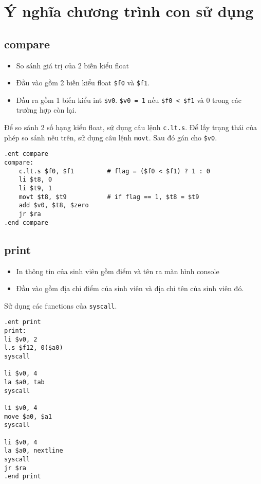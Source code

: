 \documentclass{article}
\begin{document}
\section{Ý nghĩa chương trình con sử dụng}
\subsection{compare}
\begin{itemize}
    \item So sánh giá trị của 2 biến kiểu float 
    \item Đầu vào gồm 2 biến kiểu float \verb|$f0| và \verb|$f1|.
    \item Đầu ra gồm 1 biến kiểu int \verb|$v0|. \verb|$v0 = 1| nếu \verb|$f0 < $f1| và 0 trong các trường hợp còn lại. 
\end{itemize}

Để so sánh 2 số hạng kiểu float, sử dụng câu lệnh \verb|c.lt.s|. Để lấy trạng thái của phép so sánh nêu trên, sử dụng câu lệnh \verb|movt|. Sau đó gán cho \verb|$v0|.
\begin{lstlisting}
.ent compare
compare:
    c.lt.s $f0, $f1			# flag = ($f0 < $f1) ? 1 : 0
    li $t8, 0
    li $t9, 1
    movt $t8, $t9			# if flag == 1, $t8 = $t9 
    add $v0, $t8, $zero
    jr $ra	
.end compare    
\end{lstlisting}
\subsection{print}
\begin{itemize}
    \item In thông tin của sinh viên gồm điểm và tên ra màn hình console
    \item Đầu vào gồm địa chỉ điểm của sinh viên và địa chỉ tên của sinh viên đó.
\end{itemize}
Sử dụng các functions của \verb|syscall|.
\begin{lstlisting}
.ent print
print:
li $v0, 2
l.s $f12, 0($a0)
syscall

li $v0, 4
la $a0, tab
syscall

li $v0, 4
move $a0, $a1
syscall

li $v0, 4
la $a0, nextline
syscall
jr $ra
.end print
\end{lstlisting}
\end{document}
